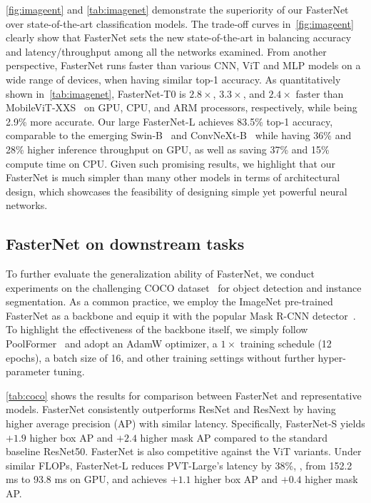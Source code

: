 \cref{fig:imageent} and \cref{tab:imagenet} demonstrate the superiority of our FasterNet over state-of-the-art classification models. The trade-off curves in~\cref{fig:imageent} clearly show that FasterNet sets the new state-of-the-art in balancing accuracy and latency/throughput among all the networks examined. From another perspective, FasterNet runs faster than various CNN, ViT and MLP models on a wide range of devices, when having similar top-1 accuracy. As quantitatively shown in~\cref{tab:imagenet}, FasterNet-T0 is $2.8\times$, $3.3\times$, and $2.4\times$
faster than MobileViT-XXS~\cite{mehta2021mobilevit} on GPU, CPU, and ARM processors, respectively, while being 2.9\% more accurate.
Our large FasterNet-L achieves 83.5\% top-1 accuracy, comparable to the emerging Swin-B~\cite{liu2021swin} and ConvNeXt-B~\cite{liu2022convnet} while having 36\% and 28\% higher inference throughput on GPU, as well as saving 37\% and 15\% compute time on CPU. Given such promising results, we highlight that our FasterNet is much simpler than many other models in terms of architectural design, which showcases the feasibility of designing simple yet powerful neural networks.


\subsection{FasterNet on downstream tasks}
To further evaluate the generalization ability of FasterNet, we conduct experiments on the challenging COCO dataset~\cite{lin2014microsoft} for object detection and instance segmentation. As a common practice, we employ the ImageNet pre-trained FasterNet as a backbone and equip it with the popular Mask R-CNN detector~\cite{he2017mask}. To highlight the effectiveness of the backbone itself, we simply follow PoolFormer~\cite{yu2022metaformer} and adopt an AdamW optimizer, a $1 \times$ training schedule (12 epochs), a batch size of 16, and other training settings without further hyper-parameter tuning.

\cref{tab:coco} shows the results for comparison between FasterNet and representative models. FasterNet consistently outperforms ResNet and ResNext by having higher average precision (AP) with similar latency. Specifically, FasterNet-S yields $+1.9$ higher box AP and $+2.4$ higher mask AP compared to the standard baseline ResNet50. FasterNet is also competitive against the ViT variants. Under similar FLOPs, FasterNet-L reduces PVT-Large's latency by 38\%, \ie, from 152.2 ms to 93.8 ms on GPU, and achieves $+1.1$ higher box AP and $+0.4$ higher mask AP.

